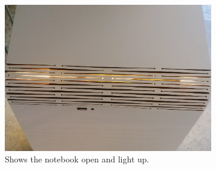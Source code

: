 \documentclass[04_projectProcess.tex]{subfiles}
\begin{document}
\begin{flushleft}
            \begin{figure}[H]
                \centering
                \begin{subfigure}{.45\textwidth}
                    \centering
                    \includegraphics[width=0.8\linewidth]{images/projectideas/inspiration_on.jpg}
                    \caption{Shows the notebook open and light up.}
                    \label{fig:inspirationLightUp}
                \vspace{6mm}
                \end{subfigure}
                \begin{subfigure}{.45\textwidth}
                    \centering

\end{subfigure}
\end{figure}
\end{flushleft}
\end{document}
